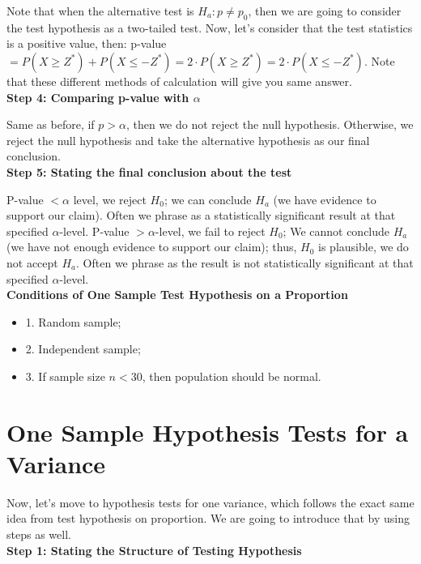 Note that when the alternative test is $H_a: p \neq p_0$, then we are going to consider the test hypothesis as a two-tailed test. Now, let's consider that the test statistics is a positive value, then: p-value $= P(X \ge Z^*) + P(X \le -Z^*) = 2 \cdot P(X \ge Z^*) = 2 \cdot  P(X \le -Z^*)$. Note that these different methods of calculation will give you same answer.\\

\textbf{Step 4: Comparing p-value with $\alpha$}

Same as before, if $p > \alpha$, then we do not reject the null hypothesis. Otherwise, we reject the null hypothesis and take the alternative hypothesis as our final conclusion.\\

\textbf{Step 5: Stating the final conclusion about the test}

P-value $< \alpha$ level, we reject $H_0$; we can conclude $H_a$ (we have evidence to support our claim). Often we phrase as a statistically significant result at that specified $\alpha$-level. P-value $> \alpha$-level, we fail to reject $H_0$; We cannot conclude $H_a$ (we have not enough evidence to support our claim); thus, $H_0$ is plausible, we do not accept $H_a$. Often we phrase as the result is not statistically significant at that specified $\alpha$-level.\\

\textbf{Conditions of One Sample Test Hypothesis on a Proportion}

\begin{itemize}
	\item 1. Random sample;
	\item 2. Independent sample;
	\item 3. If sample size $n < 30$, then population should be normal.
\end{itemize}

\section{One Sample Hypothesis Tests for a Variance}

Now, let's move to hypothesis tests for one variance, which follows the exact same idea from test hypothesis on proportion. We are going to introduce that by using steps as well.\\

\textbf{Step 1: Stating the Structure of Testing Hypothesis}

